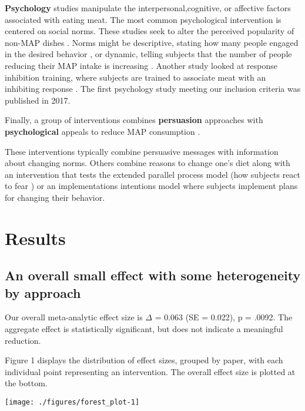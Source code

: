 \documentclass[sn-nature,referee,pdflatex]{sn-jnl}
\begin{document}
\textbf{Psychology} studies
\citep{aldoh2023, allen2002, camp2019, coker2022, griesoph2021, piester2020, sparkman2017, sparkman2020}
manipulate the interpersonal,cognitive, or affective factors associated
with eating meat. The most common psychological intervention is centered
on social norms. These studies seek to alter the perceived popularity of
non-MAP dishes \citep{sparkman2017}. Norms might be descriptive, stating
how many people engaged in the desired behavior \citep{aldoh2023}, or
dynamic, telling subjects that the number of people reducing their MAP
intake is increasing
\citep{aldoh2023, coker2022, sparkman2017, sparkman2020}. Another study
looked at response inhibition training, where subjects are trained to
associate meat with an inhibiting response \citep{camp2019}. The first
psychology study meeting our inclusion criteria was published in 2017.

Finally, a group of interventions combines \textbf{persuasion}
approaches with \textbf{psychological} appeals to reduce MAP consumption
\citep{berndsen2005, bertolaso2015, carfora2023, fehrenbach2015, hennessy2016, mattson2020, piester2020, shreedhar2021}.

These interventions typically combine persuasive messages with
information about changing norms. Others combine reasons to change one's
diet along with an intervention that tests the extended parallel process
model (how subjects react to fear \citep{fehrenbach2015}) or an
implementations intentions model \citep{shreedhar2021} where subjects
implement plans for changing their behavior.

\section{Results}\label{sec2}

\subsection{An overall small effect with some heterogeneity by
approach}\label{sec2.1}

Our overall meta-analytic effect size is \(\Delta\) = 0.063 (SE =
0.022), p = .0092. The aggregate effect is statistically significant,
but does not indicate a meaningful reduction.

Figure 1 displays the distribution of effect sizes, grouped by paper,
with each individual point representing an intervention. The overall
effect size is plotted at the bottom.

\texttt{[image: ./figures/forest\_plot-1]}
\end{document}
